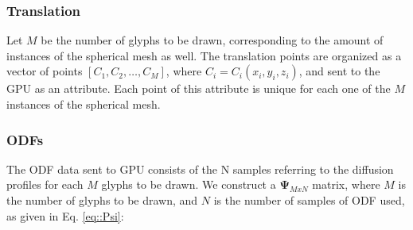 \documentclass[twoside,twocolumn,10pt]{article}
\begin{document}


\subsubsection{Translation}
Let $M$ be the number of glyphs to be drawn, corresponding to the amount of instances of the spherical mesh as well. The translation points are organized as a vector of points $[C_1,C_2, \dots, C_M]$, where $C_i= C_i(x_i, y_i, z_i)$, and sent to the GPU as an attribute. Each point of this attribute is unique for each one of the $M$ instances of the spherical mesh.




\subsubsection{ODFs}

The ODF data sent to GPU consists of the N samples referring to the diffusion profiles for each $M$ glyphs to be drawn. We construct a $\bm{\Psi}_{MxN}$ matrix, where $M$ is the number of glyphs to be drawn, and $N$ is the number of samples of ODF used, as given in Eq. \ref{eq::Psi}:
\end{document}

